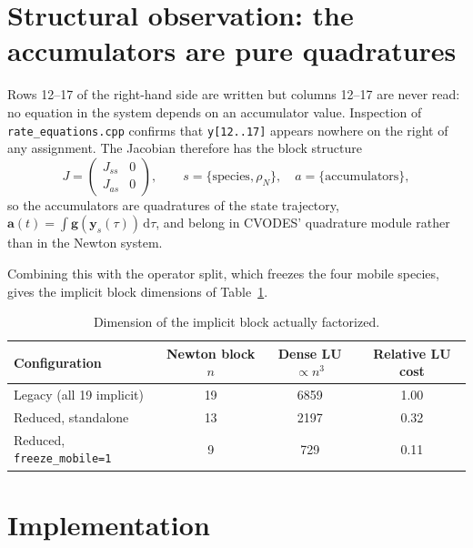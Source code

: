 \documentclass[11pt,a4paper]{article}
\newcommand{\code}[1]{\texttt{\small #1}}
\begin{document}
\section{Structural observation: the accumulators are pure quadratures}

Rows 12--17 of the right-hand side are written but columns 12--17 are never
read: no equation in the system depends on an accumulator value. Inspection of
\code{rate\_equations.cpp} confirms that \code{y[12..17]} appears nowhere on the
right of any assignment. The Jacobian therefore has the block structure
\begin{equation}
J=\begin{pmatrix}
J_{ss} & 0 \\[2pt]
J_{as} & 0
\end{pmatrix},
\qquad
s=\{\text{species},\rho_N\},\quad a=\{\text{accumulators}\},
\end{equation}
so the accumulators are quadratures of the state trajectory,
$\mathbf a(t)=\int \mathbf g(\mathbf y_s(\tau))\,\mathrm d\tau$, and belong in
CVODES' quadrature module rather than in the Newton system.

Combining this with the operator split, which freezes the four mobile species,
gives the implicit block dimensions of Table~\ref{tab:dims}.

\begin{table}[htb]
\centering
\caption{Dimension of the implicit block actually factorized.}
\label{tab:dims}
\begin{tabular}{lccc}
\toprule
Configuration & Newton block $n$ & Dense LU $\propto n^3$ & Relative LU cost \\
\midrule
Legacy (all 19 implicit)                & 19 & 6859 & 1.00 \\
Reduced, standalone                     & 13 & 2197 & 0.32 \\
Reduced, \code{freeze\_mobile=1}        &  9 &  729 & 0.11 \\
\bottomrule
\end{tabular}
\end{table}

\section{Implementation}
\end{document}
